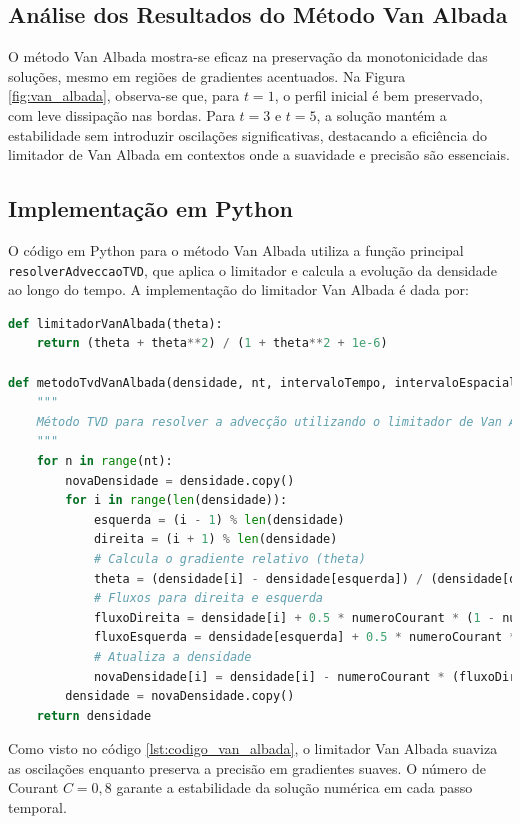 \subsection{Análise dos Resultados do Método Van Albada}

O método Van Albada mostra-se eficaz na preservação da monotonicidade das soluções, mesmo em regiões de gradientes acentuados. Na Figura \ref{fig:van_albada}, observa-se que, para \( t = 1 \), o perfil inicial é bem preservado, com leve dissipação nas bordas. Para \( t = 3 \) e \( t = 5 \), a solução mantém a estabilidade sem introduzir oscilações significativas, destacando a eficiência do limitador de Van Albada em contextos onde a suavidade e precisão são essenciais.

\subsection{Implementação em Python}

O código em Python para o método Van Albada utiliza a função principal \texttt{resolverAdveccaoTVD}, que aplica o limitador e calcula a evolução da densidade ao longo do tempo. A implementação do limitador Van Albada é dada por:

\begin{lstlisting}[language=Python, caption={Código para resolver a advecção usando o método Van Albada}, label={lst:codigo_van_albada}]
def limitadorVanAlbada(theta):
    return (theta + theta**2) / (1 + theta**2 + 1e-6)

def metodoTvdVanAlbada(densidade, nt, intervaloTempo, intervaloEspacial, numeroCourant):
    """
    Método TVD para resolver a advecção utilizando o limitador de Van Albada.
    """
    for n in range(nt):
        novaDensidade = densidade.copy()
        for i in range(len(densidade)):
            esquerda = (i - 1) % len(densidade)
            direita = (i + 1) % len(densidade)
            # Calcula o gradiente relativo (theta)
            theta = (densidade[i] - densidade[esquerda]) / (densidade[direita] - densidade[i] + 1e-6)
            # Fluxos para direita e esquerda
            fluxoDireita = densidade[i] + 0.5 * numeroCourant * (1 - numeroCourant) * limitadorVanAlbada(theta) * (densidade[direita] - densidade[i])
            fluxoEsquerda = densidade[esquerda] + 0.5 * numeroCourant * (1 - numeroCourant) * limitadorVanAlbada(theta) * (densidade[i] - densidade[esquerda])
            # Atualiza a densidade
            novaDensidade[i] = densidade[i] - numeroCourant * (fluxoDireita - fluxoEsquerda)
        densidade = novaDensidade.copy()
    return densidade
\end{lstlisting}

Como visto no código \ref{lst:codigo_van_albada}, o limitador Van Albada suaviza as oscilações enquanto preserva a precisão em gradientes suaves. O número de Courant \(C=0,8\) garante a estabilidade da solução numérica em cada passo temporal.

